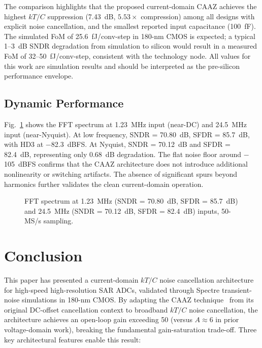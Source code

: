 \documentclass[journal]{IEEEtran}
\begin{document}
The comparison highlights that the proposed current-domain CAAZ achieves the highest $kT/C$ suppression (7.43~dB, $5.53\times$ compression) among all designs with explicit noise cancellation, and the smallest reported input capacitance (100~fF). The simulated FoM of 25.6~fJ/conv-step in 180-nm CMOS is expected; a typical 1--3~dB SNDR degradation from simulation to silicon would result in a measured FoM of 32--50~fJ/conv-step, consistent with the technology node. All values for this work are simulation results and should be interpreted as the pre-silicon performance envelope.

\subsection{Dynamic Performance}

Fig.~\ref{fig:fft} shows the FFT spectrum at 1.23~MHz input (near-DC) and 24.5~MHz input (near-Nyquist). At low frequency, SNDR = 70.80~dB, SFDR = 85.7~dB, with HD3 at $-$82.3~dBFS. At Nyquist, SNDR = 70.12~dB and SFDR = 82.4~dB, representing only 0.68~dB degradation. The flat noise floor around $-$105~dBFS confirms that the CAAZ architecture does not introduce additional nonlinearity or switching artifacts. The absence of significant spurs beyond harmonics further validates the clean current-domain operation.

\begin{figure}[!t]
\centering
{}
\caption{FFT spectrum at 1.23~MHz (SNDR = 70.80~dB, SFDR = 85.7~dB) and 24.5~MHz (SNDR = 70.12~dB, SFDR = 82.4~dB) inputs, 50-MS/s sampling.}
\label{fig:fft}
\end{figure}

\section{Conclusion}
\label{sec:conclusion}

This paper has presented a current-domain $kT/C$ noise cancellation architecture for high-speed high-resolution SAR ADCs, validated through Spectre transient-noise simulations in 180-nm CMOS. By adapting the CAAZ technique~\cite{safiallah2023_Currentadjusting} from its original DC-offset cancellation context to broadband $kT/C$ noise cancellation, the architecture achieves an open-loop gain exceeding 50 (versus $A\approx 6$ in prior voltage-domain work), breaking the fundamental gain-saturation trade-off. Three key architectural features enable this result:
\end{document}
